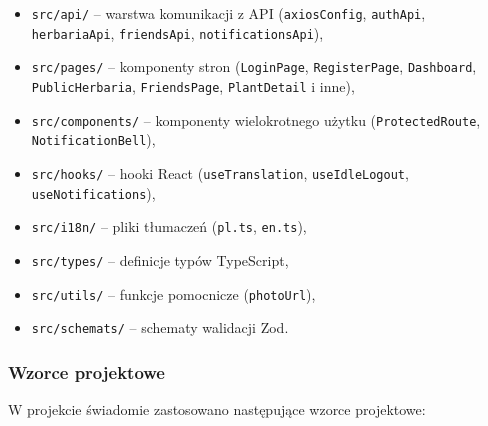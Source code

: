 \documentclass[12pt,a4paper]{article}
\begin{document}
\begin{itemize}[label=\textbullet, leftmargin=1.5cm]
    \item \texttt{src/api/} -- warstwa komunikacji z API (\texttt{axiosConfig}, \texttt{authApi}, \texttt{herbariaApi}, \texttt{friendsApi}, \texttt{notificationsApi}),
    \item \texttt{src/pages/} -- komponenty stron (\texttt{LoginPage}, \texttt{RegisterPage}, \texttt{Dashboard}, \texttt{PublicHerbaria}, \texttt{FriendsPage}, \texttt{PlantDetail} i inne),
    \item \texttt{src/components/} -- komponenty wielokrotnego u\.zytku (\texttt{ProtectedRoute}, \texttt{NotificationBell}),
    \item \texttt{src/\allowbreak{}hooks/} -- hooki React (\texttt{useTranslation}, \texttt{useIdleLogout}, \texttt{useNotifications}),
    \item \texttt{src/i18n/} -- pliki t\l{}umacze\'n (\texttt{pl.ts}, \texttt{en.ts}),
    \item \texttt{src/types/} -- definicje typ\'ow TypeScript,
    \item \texttt{src/utils/} -- funkcje pomocnicze (\texttt{photoUrl}),
    \item \texttt{src/schemats/} -- schematy walidacji Zod.
\end{itemize}

\subsubsection{Wzorce projektowe}

W projekcie \'swiadomie zastosowano nast\k{e}puj\k{a}ce wzorce projektowe:
\end{document}

